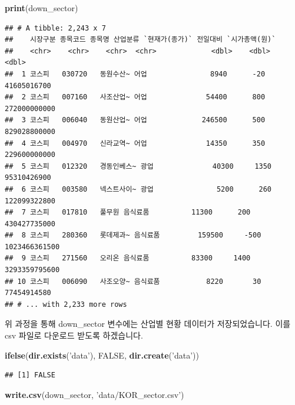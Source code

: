 \documentclass[]{book}
\newenvironment{Shaded}{\begin{snugshade}}{\end{snugshade}}
\newcommand{\KeywordTok}[1]{\textcolor[rgb]{0.13,0.29,0.53}{\textbf{#1}}}
\newcommand{\NormalTok}[1]{#1}
\newcommand{\OtherTok}[1]{\textcolor[rgb]{0.56,0.35,0.01}{#1}}
\newcommand{\StringTok}[1]{\textcolor[rgb]{0.31,0.60,0.02}{#1}}
\begin{document}
\begin{Shaded}
\begin{Highlighting}[]
\KeywordTok{print}\NormalTok{(down_sector)}
\end{Highlighting}
\end{Shaded}

\begin{verbatim}
## # A tibble: 2,243 x 7
##    시장구분 종목코드 종목명 산업분류 `현재가(종가)` 전일대비 `시가총액(원)`
##    <chr>    <chr>    <chr>  <chr>             <dbl>    <dbl>          <dbl>
##  1 코스피   030720   동원수산~ 어업               8940      -20    41605016700
##  2 코스피   007160   사조산업~ 어업              54400      800   272000000000
##  3 코스피   006040   동원산업~ 어업             246500      500   829028800000
##  4 코스피   004970   신라교역~ 어업              14350      350   229600000000
##  5 코스피   012320   경동인베스~ 광업              40300     1350    95310426900
##  6 코스피   003580   넥스트사이~ 광업               5200      260   122099322800
##  7 코스피   017810   풀무원 음식료품          11300      200   430427735000
##  8 코스피   280360   롯데제과~ 음식료품         159500     -500  1023466361500
##  9 코스피   271560   오리온 음식료품          83300     1400  3293359795600
## 10 코스피   006090   사조오양~ 음식료품           8220       30    77454914580
## # ... with 2,233 more rows
\end{verbatim}

위 과정을 통해 down\_sector 변수에는 산업별 현황 데이터가 저장되었습니다. 이를 csv 파일로 다운로드 받도록 하겠습니다.

\begin{Shaded}
\begin{Highlighting}[]
\KeywordTok{ifelse}\NormalTok{(}\KeywordTok{dir.exists}\NormalTok{(}\StringTok{'data'}\NormalTok{), }\OtherTok{FALSE}\NormalTok{, }\KeywordTok{dir.create}\NormalTok{(}\StringTok{'data'}\NormalTok{))}
\end{Highlighting}
\end{Shaded}

\begin{verbatim}
## [1] FALSE
\end{verbatim}

\begin{Shaded}
\begin{Highlighting}[]
\KeywordTok{write.csv}\NormalTok{(down_sector, }\StringTok{'data/KOR_sector.csv'}\NormalTok{)}
\end{Highlighting}
\end{Shaded}
\end{document}
